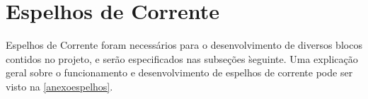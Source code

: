 \section{Espelhos de Corrente}

Espelhos de Corrente foram necess\'arios para o desenvolvimento de diversos blocos contidos no projeto, e ser\~ao especificados nas subse{\c c}\~oes \` seguinte. Uma explica{\c c}\~ao geral sobre o funcionamento e desenvolvimento de espelhos de corrente pode ser visto na \autoref{anexoespelhos}.



